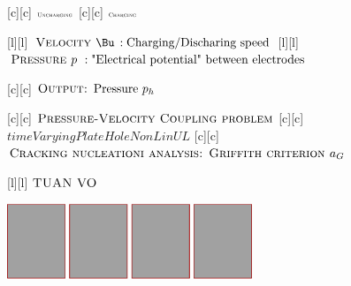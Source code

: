 [c][c] {$\textsc{\tiny Uncharging}$}
[c][c] {$\textsc{\tiny Charging}$}

[l][l] {$\textsc{Velocity } \Bu \, :\text{Charging/Discharing speed}$}
[l][l] {$\textsc{Pressure } p   \,\, :\text{"Electrical potential" between electrodes}$}

[c][c] {$\textsc{Output: } \text{Pressure } p_h$}

[c][c] {$\textsc{Pressure-Velocity Coupling problem}$}
[c][c] {$timeVaryingPlateHoleNonLinUL$}
[c][c] {$\textsc{Cracking nucleationi analysis: Griffith criterion } a_{G}$}

[l][l] {$\textsc{TUAN VO}$}

\includegraphics[width=0.55\textwidth]{comparison_ana_numa.eps}